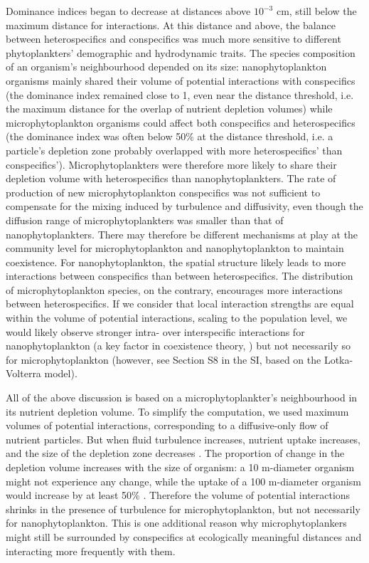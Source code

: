 \documentclass[english]{article}
\begin{document}
Dominance indices began to decrease at distances above $10^{-3}$
cm, still below the maximum distance for interactions. At this distance
and above, the balance between heterospecifics and conspecifics was
much more sensitive to different phytoplankters' demographic and hydrodynamic
traits. The species composition of an organism's neighbourhood depended
on its size: nanophytoplankton organisms mainly shared their volume
of potential interactions with conspecifics (the dominance index remained
close to 1, even near the distance threshold, i.e. the maximum distance
for the overlap of nutrient depletion volumes) while microphytoplankton
organisms could affect both conspecifics and heterospecifics (the
dominance index was often below 50\% at the distance threshold, i.e.
a particle's depletion zone probably overlapped with more heterospecifics'
than conspecifics'). Microphytoplankters were therefore more likely
to share their depletion volume with heterospecifics than nanophytoplankters.
The rate of production of new microphytoplankton conspecifics was
not sufficient to compensate for the mixing induced by turbulence
and diffusivity, even though the diffusion range of microphytoplankters
was smaller than that of nanophytoplankters. There may therefore be
different mechanisms at play at the community level for microphytoplankton
and nanophytoplankton to maintain coexistence. For nanophytoplankton,
the spatial structure likely leads to more interactions between conspecifics
than between heterospecifics. The distribution of microphytoplankton
species, on the contrary, encourages more interactions between heterospecifics.
If we consider that local interaction strengths are equal within the
volume of potential interactions, scaling to the population level,
we would likely observe stronger intra- over interspecific interactions
for nanophytoplankton (a key factor in coexistence theory, \citealp{barabas_self-regulation_2017})
but not necessarily so for microphytoplankton (however, see Section
S8 in the SI, based on the Lotka-Volterra model).

All of the above discussion is based on a microphytoplankter's neighbourhood
in its nutrient depletion volume. To simplify the computation, we
used maximum volumes of potential interactions, corresponding to a
diffusive-only flow of nutrient particles. But when fluid turbulence
increases, nutrient uptake increases, and the size of the depletion
zone decreases \citep{karp-boss_nutrient_1996}. The proportion of
change in the depletion volume increases with the size of organism:
a 10 \textmu m-diameter organism might not experience any change,
while the uptake of a 100 \textmu m-diameter organism would increase
by at least 50\% \citep{karp-boss_nutrient_1996}. Therefore the volume
of potential interactions shrinks in the presence of turbulence for
microphytoplankton, but not necessarily for nanophytoplankton. This
is one additional reason why microphytoplankers might still be surrounded
by conspecifics at ecologically meaningful distances and interacting
more frequently with them.
\end{document}
